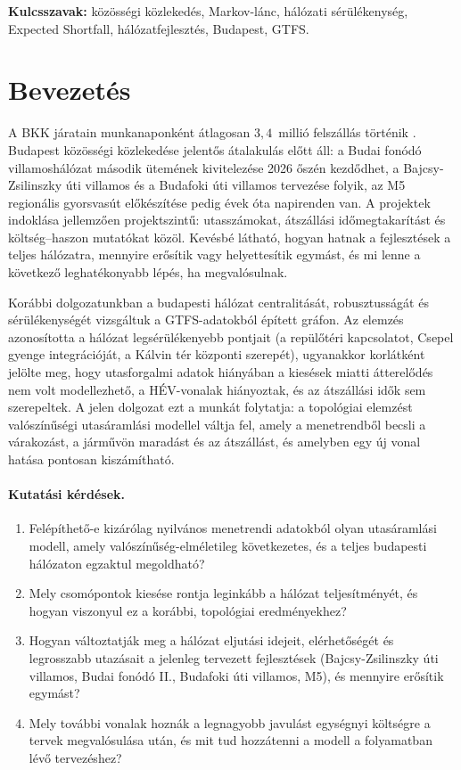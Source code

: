 \documentclass[12pt,a4paper]{article}
\theoremstyle{definition}
\theoremstyle{remark}
\begin{document}
\medskip\noindent
\textbf{Kulcsszavak:} közösségi közlekedés, Markov-lánc, hálózati
sérülékenység, Expected Shortfall, hálózatfejlesztés, Budapest, GTFS.

\clearpage

\section{Bevezetés}
\label{sec:bev}

A BKK járatain munkanaponként átlagosan $3{,}4$~millió felszállás történik
\citep{bkk2024}. Budapest közösségi közlekedése jelentős átalakulás előtt
áll: a Budai fonódó villamoshálózat második ütemének kivitelezése 2026 őszén
kezdődhet, a Bajcsy-Zsilinszky úti villamos és a Budafoki úti villamos
tervezése folyik, az M5 regionális gyorsvasút előkészítése pedig évek óta
napirenden van. A projektek indoklása jellemzően projektszintű: utasszámokat,
átszállási időmegtakarítást és költség--haszon mutatókat közöl. Kevésbé
látható, hogyan hatnak a fejlesztések a teljes hálózatra, mennyire erősítik
vagy helyettesítik egymást, és mi lenne a következő leghatékonyabb lépés, ha
megvalósulnak.

Korábbi dolgozatunkban \citep{molnar2026} a budapesti hálózat centralitását,
robusztusságát és sérülékenységét vizsgáltuk a GTFS-adatokból épített gráfon.
Az elemzés azonosította a hálózat legsérülékenyebb pontjait (a repülőtéri
kapcsolatot, Csepel gyenge integrációját, a Kálvin tér központi szerepét),
ugyanakkor korlátként jelölte meg, hogy utasforgalmi adatok hiányában a
kiesések miatti átterelődés nem volt modellezhető, a HÉV-vonalak hiányoztak,
és az átszállási idők sem szerepeltek. A jelen dolgozat ezt a munkát
folytatja: a topológiai elemzést valószínűségi utasáramlási modellel váltja
fel, amely a menetrendből becsli a várakozást, a járművön maradást és az
átszállást, és amelyben egy új vonal hatása pontosan kiszámítható.

\paragraph{Kutatási kérdések.}
\begin{enumerate}[label=K\arabic*.]
  \item Felépíthető-e kizárólag nyilvános menetrendi adatokból olyan
    utasáramlási modell, amely valószínűség-elméletileg következetes, és a
    teljes budapesti hálózaton egzaktul megoldható?
  \item Mely csomópontok kiesése rontja leginkább a hálózat teljesítményét,
    és hogyan viszonyul ez a korábbi, topológiai eredményekhez?
  \item Hogyan változtatják meg a hálózat eljutási idejeit, elérhetőségét és
    legrosszabb utazásait a jelenleg tervezett fejlesztések (Bajcsy-Zsilinszky
    úti villamos, Budai fonódó II., Budafoki úti villamos, M5), és mennyire
    erősítik egymást?
  \item Mely további vonalak hoznák a legnagyobb javulást egységnyi
    költségre a tervek megvalósulása után, és mit tud hozzátenni a modell a
    folyamatban lévő tervezéshez?
\end{enumerate}
\end{document}
